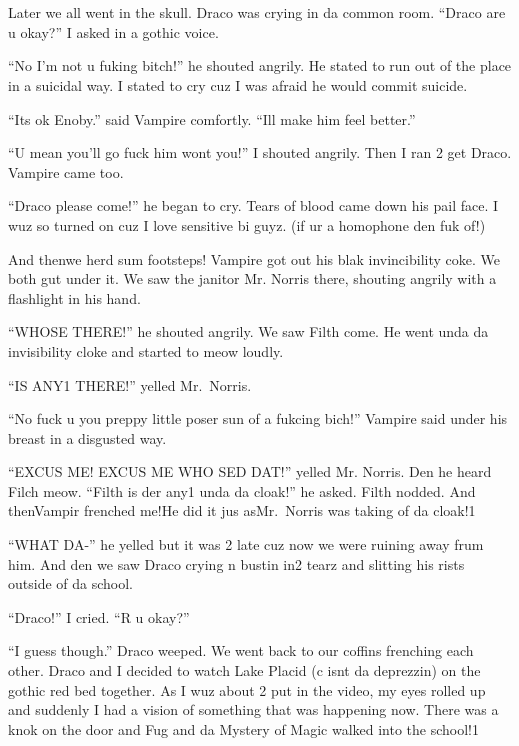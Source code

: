 \section{}



Later we all went in the skull. Draco was crying in da common room. \enquote{Draco are u okay?} I asked in a gothic voice.

\enquote{No I'm not u fuking bitch!} he shouted angrily. He stated to run out of the place in a suicidal way. I stated to cry cuz I was afraid he would commit suicide.

\enquote{Its ok Enoby.} said Vampire comfortly. \enquote{Ill make him feel better.}

\enquote{U mean you'll go fuck him wont you!} I shouted angrily. Then I ran 2 get Draco. Vampire came too.

\enquote{Draco please come!} he began to cry. Tears of blood came down his pail face. I wuz so turned on cuz I love sensitive bi guyz. (if ur a homophone den fuk of!)

And then\dotfill we herd sum footsteps! Vampire got out his blak invincibility coke. We both gut under it. We saw the janitor Mr. Norris there, shouting angrily with a flashlight in his hand.

\enquote{WHOSE THERE\@!} he shouted angrily. We saw Filth come. He went unda da invisibility cloke and started to meow loudly.

\enquote{IS ANY1 THERE\@!} yelled Mr.~Norris.

\enquote{No fuck u you preppy little poser sun of a fukcing bich!} Vampire said under his breast in a disgusted way.

\enquote{EXCUS ME\@! EXCUS ME WHO SED DAT\@!} yelled Mr. Norris. Den he heard Filch meow. \enquote{Filth is der any1 unda da cloak!} he asked. Filth nodded. And then\dotfill Vampir frenched me!\newline He did it jus as\dotfill Mr.~Norris was taking of da cloak!1

\enquote{WHAT DA-} he yelled but it was 2 late cuz now we were ruining away frum him. And den we saw Draco crying n bustin in2 tearz and slitting his rists outside of da school.

\enquote{Draco!} I cried. \enquote{R u okay?}

\enquote{I guess though.} Draco weeped. We went back to our coffins frenching each other. Draco and I decided to watch Lake Placid (c isnt da deprezzin) on the gothic red bed together. As I wuz about 2 put in the video, my eyes rolled up and suddenly I had a vision of something that was happening now. There was a knok on the door and Fug and da Mystery of Magic walked into the school!1

